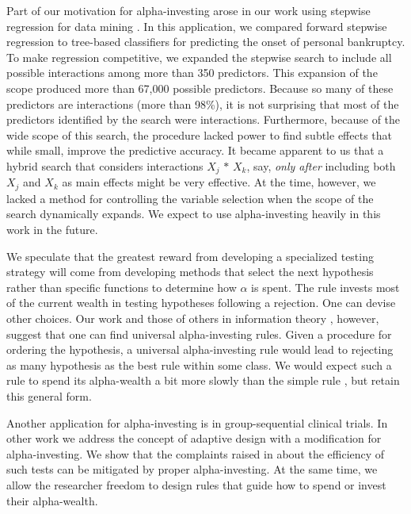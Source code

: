 \documentclass[12pt]{article}
\begin{document}
Part of our motivation for alpha-investing arose in our work using stepwise
 regression for data mining \citep{fosterstine04:bank}.  In this application, we compared forward stepwise regression to tree-based classifiers for predicting the onset
of personal bankruptcy.  To make regression competitive, we expanded
the stepwise search to include all possible interactions among more
than 350 predictors.  This expansion of the scope produced more than 67,000 possible predictors.  Because so many of these predictors are interactions
(more than 98\%), it is not surprising that most of the predictors
identified by the search were interactions.  Furthermore, because of
the wide scope of this search, the procedure lacked power to find
subtle effects that while small, improve the predictive accuracy.  It became apparent to us that a hybrid search that 
considers interactions $X_j\,*\,X_k$, say, {\em only after} including
both $X_j$ and $X_k$ as main effects might be very effective.  At the
time, however, we lacked a method for controlling the variable selection when the scope of the search dynamically expands.  We expect to use alpha-investing heavily in this work in
the future.

We speculate that the greatest reward from developing a specialized
testing strategy will come from developing methods that select the
next hypothesis rather than specific functions to determine how $\alpha$
is spent.  The rule  invests most of the current
wealth in testing hypotheses following a rejection.  One can devise other choices.  Our work and those of others in information theory \citep{rissanen83, fosterstinewyner02}, however, suggest that one can find universal alpha-investing rules.  Given a
procedure for ordering the hypothesis, a universal alpha-investing
rule would lead to rejecting as many hypothesis as the best rule
within some class. We would expect such a rule to spend its
alpha-wealth a bit more slowly than the simple rule
, but retain this general form.

Another application for alpha-investing is in group-sequential
clinical trials.  In other work \citep{fosterstine05} we address the
concept of adaptive design with a modification for alpha-investing.
We show that the complaints raised in \cite{tsiatis03} about the
efficiency of such tests can be mitigated by proper
alpha-investing.  At the same time, we allow the researcher
freedom to design rules that guide how to spend or invest their
alpha-wealth.


\end{document}
